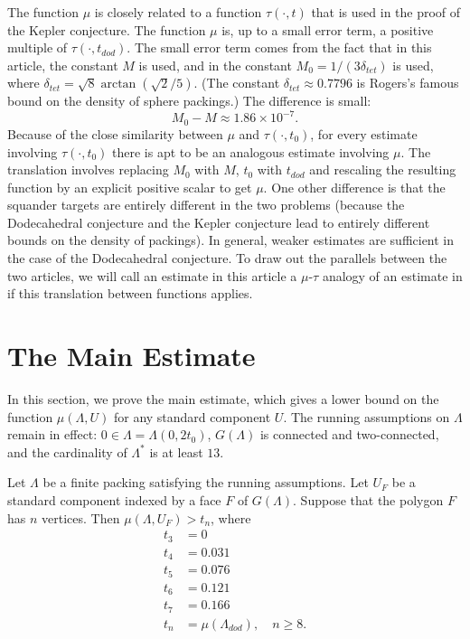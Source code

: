 \begin{remark}\label{rem:sq} The function $\mu$ is closely related to a function
$\tau(\cdot,t)$ that is used in the proof of the Kepler conjecture.  The
function $\mu$ is, up to a small error term, a positive multiple
of $\tau(\cdot,t_{dod})$.   The small
error term comes from the fact that in this article, the constant
$M$ is used, and in \cite{DCG} the constant
$M_0=1/(3 \delta_{tet})$ is used, where $\delta_{tet} = \sqrt8 \arctan(\sqrt2/5)$.  (The constant $\delta_{tet}\approx 0.7796$ is Rogers's famous bound on the density of sphere packings.)  The difference is small:
   $$M_0 - M \approx 1.86 \times 10^{-7}.$$
Because of the close similarity between $\mu$ and $\tau(\cdot,t_0)$,
for every estimate involving $\tau(\cdot,t_0)$ there is apt to
be an analogous estimate involving $\mu$.  The translation involves
replacing $M_0$ with $M$, $t_0$ with $t_{dod}$ and rescaling the
resulting function by an explicit positive scalar to get $\mu$.
One other difference is that the squander targets are entirely different
in the two problems (because the Dodecahedral conjecture and the
Kepler conjecture lead to entirely different bounds on the density
of packings).  In general, weaker estimates are sufficient in the
case of the Dodecahedral conjecture.
To draw out the parallels between the two articles, we will call
an estimate in this article a $\mu$-$\tau$ analogy of an estimate
in \cite{DCG} if this translation between functions applies.
\end{remark}



\section{The Main Estimate}

In this section, we prove the main estimate, which gives a lower
bound on the function $\mu(\Lambda,U)$ for any standard component $U$.
The running
assumptions on $\Lambda$ remain in effect: $0\in\Lambda= \Lambda(0,2t_0)$, $G(\Lambda)$ is connected and two-connected, and the cardinality
of $\Lambda^*$ is at least $13$.

\begin{theorem}\label{thm:main}  
Let $\Lambda$ be a finite packing satisfying the
running assumptions.  Let $U_F$ be a standard component indexed by
a face $F$ of $G(\Lambda)$.  Suppose that the polygon 
$F$ has $n$ vertices.  Then
   $\mu(\Lambda,U_F) > t_n$, where 
$$
\begin{array}{lll}
 t_3 &= 0\\
 t_4 &= 0.031\\
 t_5 &= 0.076\\
 t_6 &= 0.121\\
 t_7 &= 0.166\\
 t_n &= \mu(\Lambda_{dod}),\quad n\ge 8.
\end{array}
$$
\end{theorem}

